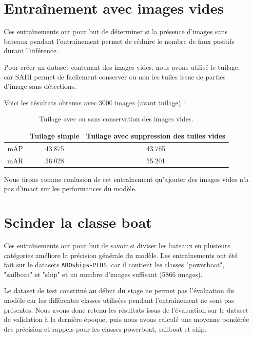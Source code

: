 \section{Entraînement avec images vides}

Ces entraînements ont pour but de déterminer si la présence d'images sans bateaux pendant l'entraînement
permet de réduire le nombre de faux positifs durant l'inférence.

Pour créer un dataset contenant des images vides, nous avons utilisé le tuilage, car SAHI permet
de facilement conserver ou non les tuiles issue de parties d'image sans détections.

Voici les résultats obtenus avec 3000 images (avant tuilage) : \\

\begin{table}[h]
    \begin{center}
        \begin{tabular}{c c c}
            \hline
            & Tuilage simple & Tuilage avec suppression des tuiles vides \\
            \hline
            mAP & 43.875 & 43.765 \\
            mAR & 56.028 & 55.201 \\
        \end{tabular}
    \end{center}
    \caption{Tuilage avec ou sans conservation des images vides.}
\end{table}

Nous tirons comme conlusion de cet entraînement qu'ajouter des images vides
n'a pas d'imact sur les performances du modèle.

\section{Scinder la classe boat}

Ces entraînements ont pour but de savoir si diviser les bateaux en plusieurs
catégories améliore la précision générale du modèle.
Les entraînements ont été fait sur le datasets \texttt{ABOships-PLUS},
car il contient les classes "powerboat", "sailboat" et "ship"
et un nombre d'images suffisant (5866 images).

Le dataset de test constitué au début du stage ne permet pas l'évaluation du modèle
car les différentes classes utilisées pendant l'entraînement ne sont pas présentes.
Nous avons donc retenu les résultats issus de l'évaluation sur le dataset de validation
à la dernière époque, puis nous avons calculé une moyenne pondérée des précision
et rappels pour les classes powerboat, sailboat et ship. \\

